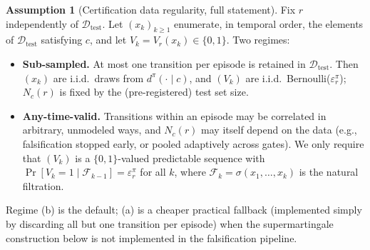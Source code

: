 \documentclass[11pt]{article}
\theoremstyle{plain}
\theoremstyle{definition}
\newtheorem{assumption}{Assumption}[section] %
\theoremstyle{remark}
\begin{document}
\begin{assumption}[Certification data regularity, full statement]
\label{ass:regularity-full}
Fix $r$ independently of $\mathcal{D}_{\mathrm{test}}$. Let $(x_k)_{k\ge1}$ enumerate, in temporal order, the elements of $\mathcal{D}_{\mathrm{test}}$ satisfying $c$, and let $V_k=V_r(x_k)\in\{0,1\}$. Two regimes:
\begin{itemize}
  \item[(a)] \textbf{Sub-sampled.} At most one transition per episode is retained in $\mathcal{D}_{\mathrm{test}}$. Then $(x_k)$ are i.i.d.\ draws from $d^\pi(\cdot\mid c)$, and $(V_k)$ are i.i.d.\ Bernoulli($\varepsilon_r^\pi$); $N_c(r)$ is fixed by the (pre-registered) test set size.
  \item[(b)] \textbf{Any-time-valid.} Transitions within an episode may be correlated in arbitrary, unmodeled ways, and $N_c(r)$ may itself depend on the data (e.g., falsification stopped early, or pooled adaptively across gates). We only require that $(V_k)$ is a $\{0,1\}$-valued predictable sequence with $\Pr[V_k=1\mid\mathcal{F}_{k-1}]=\varepsilon_r^\pi$ for all $k$, where $\mathcal{F}_k=\sigma(x_1,\dots,x_k)$ is the natural filtration.
\end{itemize}
Regime (b) is the default; (a) is a cheaper practical fallback (implemented simply by discarding all but one transition per episode) when the supermartingale construction below is not implemented in the falsification pipeline.
\end{assumption}
\end{document}
